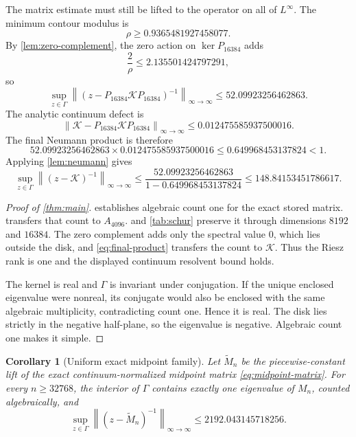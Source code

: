 \documentclass[11pt]{article}
\newtheorem{corollary}[theorem]{Corollary}
\theoremstyle{definition}
\theoremstyle{remark}
\newcommand{\cK}{\mathcal K}
\newcommand{\norm}[1]{\left\lVert #1\right\rVert}
\begin{document}
The matrix estimate must still be lifted to the operator on all of
$L^\infty$.  The minimum contour modulus is
\[
 \rho\ge0.9365481927458077.
\]
By \cref{lem:zero-complement}, the zero action on $\ker P_{16384}$ adds
\[
 \frac2\rho\le2.135501424797291,
\]
so
\begin{equation}
 \sup_{z\in\Gamma}
 \norm{(z-P_{16384}\cK P_{16384})^{-1}}_{\infty\to\infty}
 \le52.09923256462863.
 \label{eq:finite-rank-resolvent}
\end{equation}
The analytic continuum defect is
\begin{equation}
 \norm{\cK-P_{16384}\cK P_{16384}}_{\infty\to\infty}
 \le0.012475585937500016.
 \label{eq:final-defect}
\end{equation}
The final Neumann product is therefore
\begin{equation}
 52.09923256462863
 \times0.012475585937500016
 \le0.649968453137824<1.
 \label{eq:final-product}
\end{equation}
Applying \cref{lem:neumann} gives
\[
 \sup_{z\in\Gamma}\norm{(z-\cK)^{-1}}_{\infty\to\infty}
 \le
 \frac{52.09923256462863}{1-0.649968453137824}
 \le148.84153451786617.
\]

\begin{proof}[Proof of \cref{thm:main}]
 establishes algebraic count one for the exact stored
matrix.   transfers that count to $A_{4096}$.
 and \cref{tab:schur} preserve it through dimensions $8192$
and $16384$.  The zero complement adds only the spectral value $0$, which
lies outside the disk, and \eqref{eq:final-product} transfers the count to
$\cK$.  Thus the Riesz rank is one and the displayed continuum resolvent
bound holds.

The kernel is real and $\Gamma$ is invariant under conjugation.  If the
unique enclosed eigenvalue were nonreal, its conjugate would also be
enclosed with the same algebraic multiplicity, contradicting count one.
Hence it is real.  The disk lies strictly in the negative half-plane, so the
eigenvalue is negative.  Algebraic count one makes it simple.
\end{proof}

\begin{corollary}[Uniform exact midpoint family]
\label{cor:midpoint-family}
Let $\widetilde M_n$ be the piecewise-constant lift of the exact
continuum-normalized midpoint matrix \eqref{eq:midpoint-matrix}.  For every
$n\ge32768$, the interior of $\Gamma$ contains exactly one eigenvalue of
$M_n$, counted algebraically, and
\[
 \sup_{z\in\Gamma}\norm{(z-\widetilde M_n)^{-1}}_{\infty\to\infty}
 \le2192.043145718256.
\]
\end{corollary}
\end{document}
